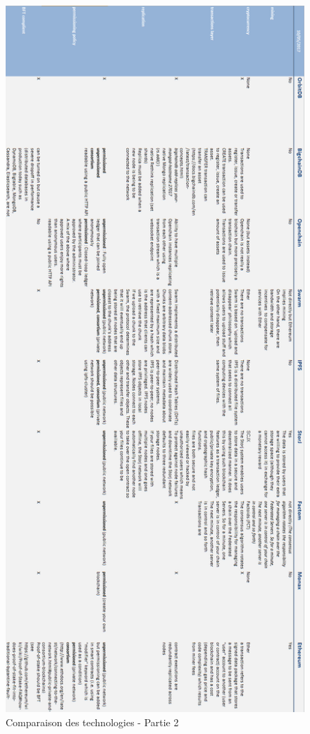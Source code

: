 \documentclass{tnreport}
\begin{document}
\begin{figure}[h]
	\centering
	\includegraphics[scale=0.5]{figures/blockchain-technologies-comparison-part2}
	\caption{Comparaison des technologies - Partie 2}
	\label{fig:comparison-part2}
\end{figure}
\end{document}
